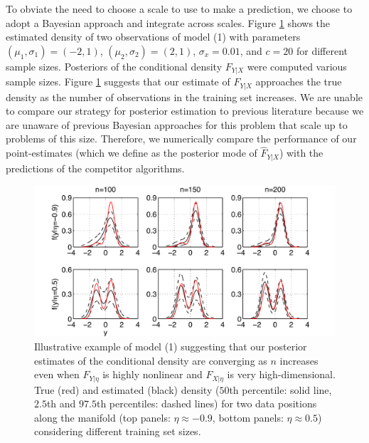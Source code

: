 \documentclass{article} %
\providecommand{\mh}[1]{\hat{#1}}
\begin{document}
To obviate the need to choose a scale to use to make a prediction, we choose to adopt a Bayesian approach and integrate across scales.  Figure \ref{plotDensity} shows the estimated density of two observations of model (1) with parameters $(\mu_1,\sigma_1)=(-2,1)$, $(\mu_2,\sigma_2)=(2,1)$, $\sigma_x=0.01$, and $c=20$ for different sample sizes. 
Posteriors of the conditional density  $F_{Y|X}$  were computed various sample sizes. Figure \ref{plotDensity} suggests that our estimate of $F_{Y|X}$ approaches the true density as the number of observations in the training set increases. We are unable to compare our strategy for posterior estimation to previous literature because we are unaware of previous Bayesian approaches for this problem that scale up to problems of this size. Therefore, we numerically compare the performance of our point-estimates (which we define as the posterior mode of $\mh{F}_{Y|X}$) with the predictions of the competitor algorithms.



\begin{figure}
  \includegraphics[width=0.5\linewidth]{../figs/density_estimates.pdf}%
  \caption{Illustrative example of model (1) suggesting that our posterior estimates of the conditional density are converging as $n$ increases even when $F_{Y|\eta}$ is highly nonlinear and $F_{X|\eta}$ is very high-dimensional.  
True (red) and estimated (black) density ($50$th percentile: solid line, $2.5$th and $97.5$th percentiles: dashed lines) for two data positions along the manifold (top panels: $\eta \approx -0.9$,  bottom panels: $\eta \approx 0.5$) considering different training set sizes.}\label{plotDensity}
\end{figure}
\vspace{-10pt}
\end{document}

